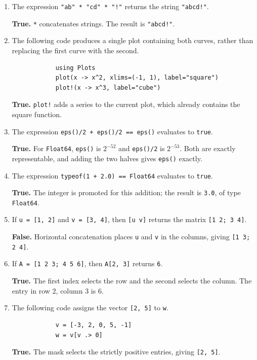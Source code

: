 \documentclass[a4paper]{article}
\newcommand{\julia}[1]{\texttt{#1}}
\newcommand{\answer}[1]{%
    \ifdefined\showsolutions
        \par\smallskip
        {\small\color{blue!60!black}#1\par}
    \fi
}
\begin{document}
\begin{enumerate}[itemsep=8pt]
    \item
        The expression \julia{"ab" * "cd" * "!"} returns the string \julia{"abcd!"}.
        \answer{\textbf{True.}
        \julia{*} concatenates strings.
        The result is \julia{"abcd!"}.}

    \item
        The following code produces a single plot containing both curves,
        rather than replacing the first curve with the second.
        \begin{verbatim}
            using Plots
            plot(x -> x^2, xlims=(-1, 1), label="square")
            plot!(x -> x^3, label="cube")
        \end{verbatim}
        \answer{\textbf{True.}
        \julia{plot!} adds a series to the current plot,
        which already contains the square function.}

    \item
        The expression \julia{eps()/2 + eps()/2 == eps()} evaluates to \julia{true}.
        \answer{\textbf{True.}
        For \julia{Float64}, \julia{eps()} is $2^{-52}$
        and \julia{eps()/2} is $2^{-53}$. Both are exactly representable,
        and adding the two halves gives \julia{eps()} exactly.}

    \item
        The expression \julia{typeof(1 + 2.0) == Float64} evaluates to \julia{true}.
        \answer{\textbf{True.}
        The integer is promoted for this addition;
        the result is \julia{3.0}, of type \julia{Float64}.}

    \item
        If \julia{u = [1, 2]} and \julia{v = [3, 4]}, then \julia{[u v]}
        returns the matrix \julia{[1 2; 3 4]}.
        \answer{\textbf{False.}
        Horizontal concatenation places \julia{u} and
        \julia{v} in the columns, giving \julia{[1 3; 2 4]}.}

    \item
        If \julia{A = [1 2 3; 4 5 6]}, then \julia{A[2, 3]} returns \julia{6}.
        \answer{\textbf{True.}
        The first index selects the row and the second
        selects the column. The entry in row 2, column 3 is 6.}

    \item
        The following code assigns the vector \julia{[2, 5]} to \julia{w}.
        \begin{verbatim}
            v = [-3, 2, 0, 5, -1]
            w = v[v .> 0]
        \end{verbatim}
        \answer{\textbf{True.}
        The mask selects the strictly positive entries,
        giving \julia{[2, 5]}.}


\end{enumerate}
\end{document}
